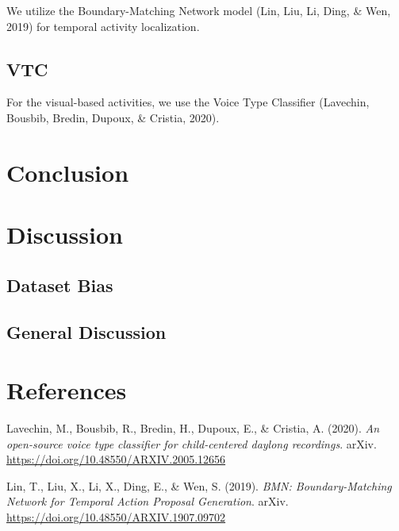 \documentclass[
  man,floatsintext]{apa6}
\newlength{\cslhangindent}
\newenvironment{CSLReferences}[2] %
 {\begin{list}{}{%
  \setlength{\itemindent}{0pt}
  \setlength{\leftmargin}{0pt}
  \setlength{\parsep}{0pt}
  \ifodd #1
   \setlength{\leftmargin}{\cslhangindent}
   \setlength{\itemindent}{-1\cslhangindent}
  \fi
  \setlength{\itemsep}{#2\baselineskip}}}
 {\end{list}}
\begin{document}
We utilize the Boundary-Matching Network model (Lin, Liu, Li, Ding, \& Wen, 2019) for temporal activity localization.

\subsection{VTC}\label{vtc}

For the visual-based activities, we use the Voice Type Classifier (Lavechin, Bousbib, Bredin, Dupoux, \& Cristia, 2020).

\section{Conclusion}\label{conclusion}

\section{Discussion}\label{discussion}

\subsection{Dataset Bias}\label{dataset-bias}

\subsection{General Discussion}\label{general-discussion}

\newpage

\section{References}\label{references}

\begingroup
\setlength{\parindent}{-0.5in}
\setlength{\leftskip}{0.5in}

\label{refs}
\begin{CSLReferences}{1}{0}
Lavechin, M., Bousbib, R., Bredin, H., Dupoux, E., \& Cristia, A. (2020). \emph{An open-source voice type classifier for child-centered daylong recordings}. arXiv. \url{https://doi.org/10.48550/ARXIV.2005.12656}

Lin, T., Liu, X., Li, X., Ding, E., \& Wen, S. (2019). \emph{{BMN}: {Boundary-Matching Network} for {Temporal Action Proposal Generation}}. arXiv. \url{https://doi.org/10.48550/ARXIV.1907.09702}

\end{CSLReferences}
\end{document}
